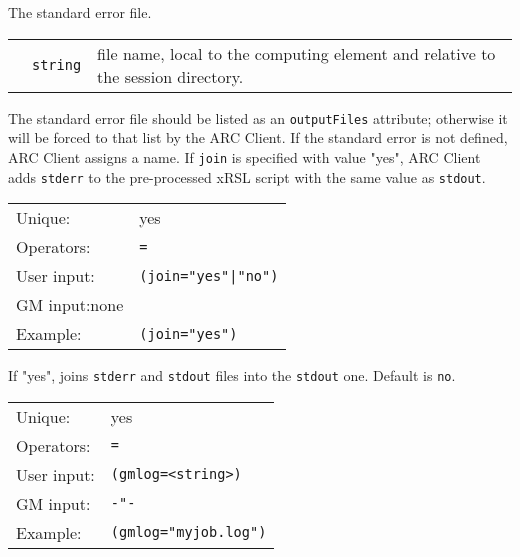   The standard error file.

  \begin{tabular}{llp{10cm}}
    \hspace*{1cm}&\texttt{string} & file name, local to the computing element and
    relative to the session directory.\\
  \end{tabular}

  The standard error file should be listed as an \texttt{outputFiles}
  attribute; otherwise it will be forced to that list by the ARC Client. If
  the standard error is not defined, ARC Client assigns a name. If \texttt{join} is 
  specified with value "yes", ARC Client adds \texttt{stderr} to the 
  pre-processed xRSL script with the same value as \texttt{stdout}.

  \hspace*{0.5cm}
  \begin{shaded}
  \end{shaded}
  \begin{tabular}{lp{13cm}}
    Unique:&yes\\
    Operators:&\verb#=#\\
    User input:&\verb#(join="yes"|"no")#\\
    GM input:none\\
    Example:&\verb#(join="yes")#\\
  \end{tabular}

  If "yes", joins \texttt{stderr} and  \texttt{stdout} files into
  the \texttt{stdout} one. Default is \verb#no#.

  \hspace*{0.5cm}
  \begin{shaded}
  \end{shaded}
  \begin{tabular}{lp{13cm}}
    Unique:&yes\\
    Operators:&\verb#=#\\
    User input:&\verb#(gmlog=<string>)#\\
    GM input:&\verb#-"-#\\
    Example:&\verb#(gmlog="myjob.log")#\\
  \end{tabular}

